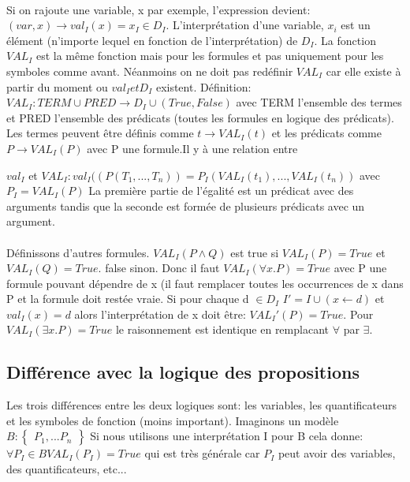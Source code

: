 \paragraph{}
Si on rajoute une variable, x par exemple, l'expression devient: $ (var, x) \rightarrow val_{I}(x) = x_{I} \in D_{I}$. L'interprétation d'une variable, $x_{i}$ est un élément (n'importe lequel en fonction de l'interprétation) de $D_{I}$. La fonction $VAL_{I}$ est la même fonction mais pour les formules et pas uniquement pour les symboles comme avant. Néanmoins on ne doit pas redéfinir $VAL_{I}$ car elle existe à partir du moment ou $val_{I} et D_{I}$ existent. Définition: $VAL_{I}: TERM \cup  PRED \rightarrow D_{I} \cup (True, False) $ avec TERM l'ensemble des termes et PRED l'ensemble des
prédicats (toutes les formules en logique des prédicats). Les termes peuvent être définis comme $ t \rightarrow VAL_{I}(t)$ et les prédicats comme $ P \rightarrow VAL_{I}(P)$ avec P une formule.Il y à une relation entre 

$val_{I} $ et $ VAL_{I}: val_{I}((P(T_{1},...,T_{n})) = P_{I}(VAL_{I}(t_{1}),...,VAL_{I}(t_{n}))$ avec $ P_{I} = VAL_{I}(P)$ 
La première partie de l'égalité est un prédicat avec des arguments tandis que la seconde est formée de plusieurs prédicats avec un argument. 
\paragraph{}
Définissons d'autres formules. $VAL_{I}(P \wedge Q) $ est true si $VAL_{I}(P) = True$ et $VAL_{I}(Q) = True$. false sinon. Donc il faut $VAL_{I}(\forall x.P) = True$ avec P une formule pouvant dépendre de x (il faut remplacer toutes les occurrences de x dans P et la formule doit restée vraie. Si pour chaque d $\in D_{I}$ $ I' = I \cup (x \leftarrow d)$ et $val_{I}(x) = d$ alors l'interprétation de x doit être: $VAL_{I}'(P) = True$.
Pour $VAL_{I}(\exists x.P) = True$ le raisonnement est identique en remplacant $\forall$ par $\exists$.
\subsection{Différence avec la logique des propositions}
Les trois différences entre les deux logiques sont: les variables, les quantificateurs et les symboles de fonction (moins important). Imaginons un modèle $B: 
\left\{
  \begin{array}{rcr}
    P_{1},...P_{n}
  \end{array}
\right\}
$
Si nous utilisons une interprétation I pour B cela donne:
$\forall P_{I} \in B VAL_{I}(P_{I}) = True$ qui est très générale car $P_{I}$ peut avoir des variables, des quantificateurs, etc...

